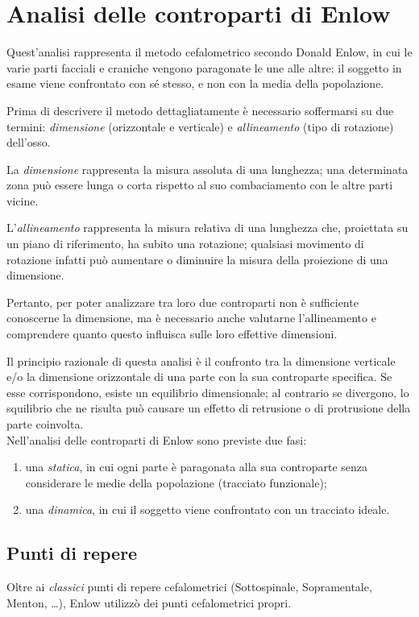 \chapter{Analisi delle controparti di Enlow}
Quest'analisi rappresenta il metodo cefalometrico secondo Donald Enlow, in cui le varie parti facciali e craniche vengono paragonate le une alle altre: il soggetto in esame viene confrontato con sé stesso, e non con la media della popolazione.

Prima di descrivere il metodo dettagliatamente è necessario soffermarsi su due termini: \emph{dimensione} (orizzontale e verticale) e \emph{allineamento} (tipo di rotazione) dell'osso.

La \emph{dimensione} rappresenta la misura assoluta di una lunghezza; una determinata zona può essere lunga o corta rispetto al suo combaciamento con le altre parti vicine.

L'\emph{allineamento} rappresenta la misura relativa di una lunghezza che, proiettata su un piano di riferimento, ha subito una rotazione; qualsiasi movimento di rotazione infatti può aumentare o diminuire la misura della proiezione di una dimensione.

Pertanto, per poter analizzare tra loro due controparti non è sufficiente conoscerne la dimensione, ma è necessario anche valutarne l'allineamento e comprendere quanto questo influisca sulle loro effettive dimensioni.

Il principio razionale di questa analisi è il confronto tra la dimensione verticale e/o la dimensione orizzontale di una parte con la sua controparte specifica. Se esse corrispondono, esiste un equilibrio dimensionale; al contrario se divergono, lo squilibrio che ne risulta può causare un effetto di retrusione o di protrusione della parte coinvolta.\\

Nell'analisi delle controparti di Enlow sono previste due fasi:
\begin{enumerate}
\item una \emph{statica}, in cui ogni parte è paragonata alla sua controparte senza considerare le medie della popolazione (tracciato funzionale);
\item una \emph{dinamica}, in cui il soggetto viene confrontato con un tracciato ideale.
\end{enumerate}

\section{Punti di repere}
Oltre ai \textit{classici} punti di repere cefalometrici (Sottospinale, Sopramentale, Menton, \ldots{}), Enlow utilizzò dei punti cefalometrici propri.
